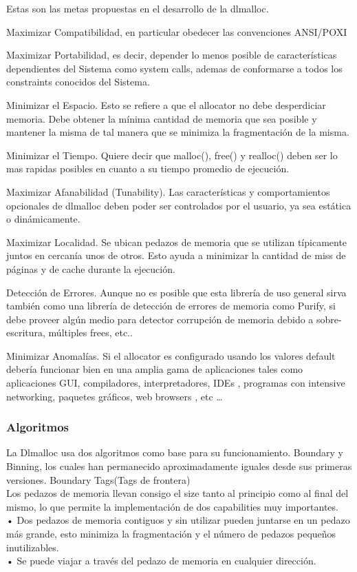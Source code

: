 \documentclass[11pt]{article} %
\begin{document}
Estas son las metas propuestas en el desarrollo de la dlmalloc.

Maximizar Compatibilidad, en particular obedecer las convenciones ANSI/POXI

Maximizar Portabilidad, es decir, depender lo menos posible de características dependientes del Sistema como system calls, ademas de conformarse a todos los constraints conocidos del Sistema.

Minimizar el Espacio. Esto se refiere a que el allocator no debe desperdiciar memoria. Debe obtener la mínima cantidad de memoria que sea posible y mantener la misma de tal manera que se minimiza la fragmentación de la misma.

Minimizar el Tiempo. Quiere decir que malloc(), free() y realloc() deben ser lo mas rapidas posibles en cuanto a su tiempo promedio de ejecución.

Maximizar Afanabilidad (Tunability). Las características y comportamientos opcionales de dlmalloc deben poder ser controlados por el usuario, ya sea estática o dinámicamente.

Maximizar Localidad. Se ubican pedazos de memoria que se utilizan típicamente juntos en cercanía unos de otros. Esto ayuda a minimizar la cantidad de miss de páginas y de cache durante la ejecución.




Detección de Errores. Aunque no es posible que esta librería de uso general sirva también como una librería de detección de errores de memoria como Purify, si debe proveer algún medio para detector corrupción de memoria debido a sobre-escritura, múltiples frees, etc..

Minimizar Anomalías. Si el allocator es configurado usando los valores default debería funcionar bien en una amplia gama de aplicaciones tales como aplicaciones GUI, compiladores, interpretadores, IDEs , programas con intensive networking, paquetes gráficos, web browsers , etc …

\subsubsection{Algoritmos}

La Dlmalloc usa dos algoritmos como base para su funcionamiento. Boundary y Binning, los cuales han permanecido aproximadamente iguales desde sus primeras versiones.
Boundary Tags(Tags de frontera)\\

Los pedazos de memoria llevan consigo el size tanto al principio como al final del mismo, lo que permite la implementación de dos capabilities muy importantes.\\
•	Dos pedazos de memoria contiguos y sin utilizar pueden juntarse en un pedazo más grande, esto minimiza la fragmentación y el número de pedazos pequeños inutilizables.\\
•	Se puede viajar a través del pedazo de memoria en cualquier dirección.\\
\end{document}
